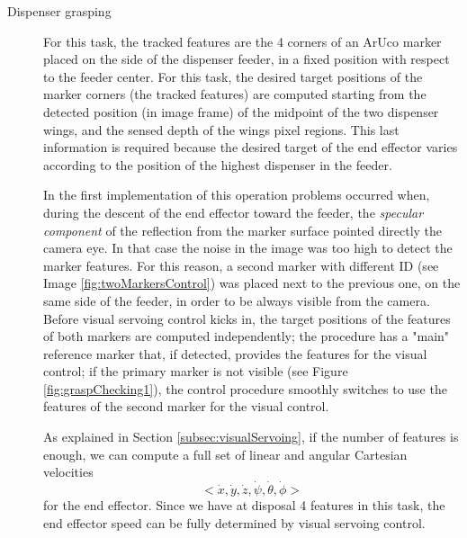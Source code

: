 \begin{description}
	\item[Dispenser grasping] For this task, the tracked features are the 4 corners of an ArUco marker placed on the side of the dispenser feeder, in a fixed position with respect to the feeder center. For this task, the desired target positions of the marker corners (the tracked features) are computed starting from the detected position (in image frame) of the midpoint of the two dispenser wings, and the sensed depth of the wings pixel regions. This last information is required because the desired target of the end effector varies according to the position of the highest dispenser in the feeder.
	
	In the first implementation of this operation problems occurred when, during the descent of the end effector toward the feeder, the \textit{specular component} of the reflection from the marker surface pointed directly the camera eye. In that case the noise in the image was too high to detect the marker features. For this reason, a second marker with different ID (see Image \ref{fig:twoMarkersControl}) was placed next to the previous one, on the same side of the feeder, in order to be always visible from the camera. Before visual servoing control kicks in, the target positions of the features of both markers are computed independently; the procedure has a "main" reference marker that, if detected, provides the features for the visual control; if the primary marker is not visible (see Figure \ref{fig:graspChecking1}), the control procedure smoothly switches to use the features of the second marker for the visual control. 
	
	As explained in Section \ref{subsec:visualServoing}, if the number of features is enough, we can compute a full set of linear and angular Cartesian velocities
	\[
		<\dot{x},\dot{y},\dot{z},\dot{\psi}, \dot{\theta}, \dot{\phi}>
	\]
for the end effector. Since we have at disposal 4 features in this task, the end effector speed can be fully determined by visual servoing control. 

\begin{figure}
	\centering
		

\end{figure}
\end{description}
